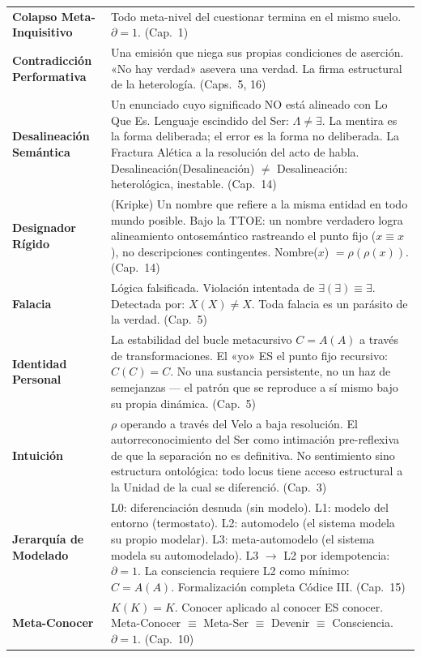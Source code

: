 \documentclass[10pt, openany, oneside]{book}
\begin{document}
{\begin{tabular}{@{} l @{\hspace{0.6em}} p{} @{}}
\textbf{Colapso Meta-Inquisitivo} & Todo meta-nivel del cuestionar termina en el mismo suelo. $\partial = 1$. (Cap.\ 1) \\[0.3em]
\textbf{Contradicción Performativa} & Una emisión que niega sus propias condiciones de aserción. «No hay verdad» asevera una verdad. La firma estructural de la heterología. (Caps.\ 5, 16) \\[0.3em]
\textbf{Desalineación Semántica} & Un enunciado cuyo significado NO está alineado con Lo Que Es. Lenguaje escindido del Ser: $\Lambda \neq \exists$. La mentira es la forma deliberada; el error es la forma no deliberada. La Fractura Alética a la resolución del acto de habla. Desalineación(Desalineación) $\neq$ Desalineación: heterológica, inestable. (Cap.\ 14) \\[0.3em]
\textbf{Designador Rígido} & (Kripke) Un nombre que refiere a la misma entidad en todo mundo posible. Bajo la TTOE: un nombre verdadero logra alineamiento ontosemántico rastreando el punto fijo ($x \equiv x$), no descripciones contingentes. Nombre($x$) $= \rho(\rho(x))$. (Cap.\ 14) \\[0.3em]
\textbf{Falacia} & Lógica falsificada. Violación intentada de $\exists(\exists) \equiv \exists$. Detectada por: $X(X) \neq X$. Toda falacia es un parásito de la verdad. (Cap.\ 5) \\[0.3em]
\textbf{Identidad Personal} & La estabilidad del bucle metacursivo $C = A(A)$ a través de transformaciones. El «yo» ES el punto fijo recursivo: $C(C) = C$. No una sustancia persistente, no un haz de semejanzas --- el patrón que se reproduce a sí mismo bajo su propia dinámica. (Cap.\ 5) \\[0.3em]
\textbf{Intuición} & $\rho$ operando a través del Velo a baja resolución. El autorreconocimiento del Ser como intimación pre-reflexiva de que la separación no es definitiva. No sentimiento sino estructura ontológica: todo locus tiene acceso estructural a la Unidad de la cual se diferenció. (Cap.\ 3) \\[0.3em]
\textbf{Jerarquía de Modelado} & L0: diferenciación desnuda (sin modelo). L1: modelo del entorno (termostato). L2: automodelo (el sistema modela su propio modelar). L3: meta-automodelo (el sistema modela su automodelado). L3 $\to$ L2 por idempotencia: $\partial = 1$. La consciencia requiere L2 como mínimo: $C = A(A)$. Formalización completa Códice III. (Cap.\ 15) \\[0.3em]
\textbf{Meta-Conocer} & $K(K) = K$. Conocer aplicado al conocer ES conocer. Meta-Conocer $\equiv$ Meta-Ser $\equiv$ Devenir $\equiv$ Consciencia. $\partial = 1$. (Cap.\ 10) \\[0.3em]

\end{tabular}}
\end{document}

